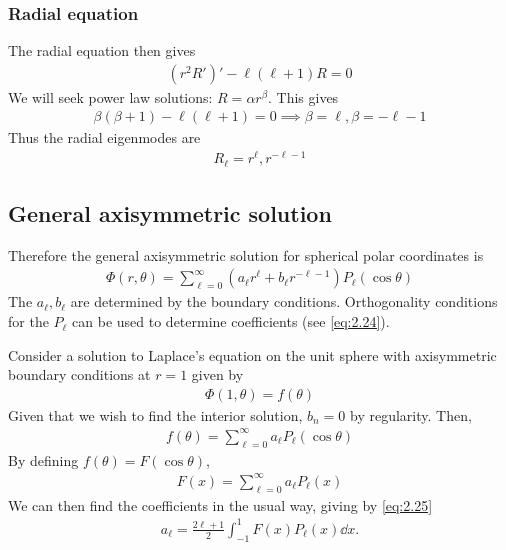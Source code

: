 \subsubsection{Radial equation}
The radial equation then gives
\begin{align*}
	(r^2 R')' - \ell (\ell + 1) R = 0
\end{align*}
We will seek power law solutions: $R = \alpha r^\beta$.
This gives
\begin{align*}
	\beta(\beta + 1) - \ell(\ell + 1) = 0 \implies \beta = \ell, \beta = -\ell - 1
\end{align*}
Thus the radial eigenmodes are
\begin{align*}
	R_\ell = r^{\ell}, r^{-\ell - 1}
\end{align*}

\subsection{General axisymmetric solution}
Therefore the general axisymmetric solution for spherical polar coordinates is
\begin{align} \label{eq:5.15}
	\Phi(r,\theta) = \sum_{\ell = 0}^\infty (a_\ell r^{\ell} + b_\ell r^{-\ell - 1}) P_\ell(\cos\theta)
\end{align}
The $a_\ell, b_\ell$ are determined by the boundary conditions.
Orthogonality conditions for the $P_\ell$ can be used to determine coefficients (see \cref{eq:2.24}).

\begin{example}
	Consider a solution to Laplace's equation on the unit sphere with axisymmetric boundary conditions at $r = 1$ given by
	\begin{align*}
		\Phi(1,\theta) = f(\theta)
	\end{align*}
	Given that we wish to find the interior solution, $b_n = 0$ by regularity.
	Then,
	\begin{align*}
		f(\theta) = \sum_{\ell=0}^\infty a_\ell P_\ell(\cos\theta)
	\end{align*}
	By defining $f(\theta) = F(\cos\theta)$,
	\begin{align*}
		F(x) = \sum_{\ell=0}^\infty a_\ell P_\ell(x)
	\end{align*}
	We can then find the coefficients in the usual way, giving by \cref{eq:2.25}
	\begin{align*}
		a_\ell = \frac{2\ell + 1}{2} \int_{-1}^1 F(x) P_{\ell}(x) \dd{x}.
	\end{align*}
\end{example} 

